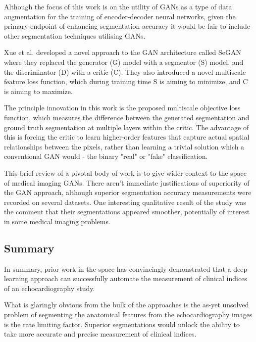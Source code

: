 Although the focus of this work is on the utility of GANs as a type of data
augmentation for the training of encoder-decoder neural networks, given the
primary endpoint of enhancing segmentation accuracy it would be fair to include
other segmentation techniques utilising GANs. \newline

Xue et al. \cite{zhangSegGANSemanticSegmentation2018} developed a novel approach
to the GAN architecture called SeGAN where they replaced the generator (G) model with a segmentor (S) model,
and the discriminator (D) with a critic (C). They also introduced a novel
multiscale feature loss function, which during training time S is aiming to
minimize, and C is aiming to maximize. \newline

The principle innovation in this work is the proposed multiscale objective loss
function, which measures the difference between the generated segmentation and ground
truth segmentation at multiple layers within the critic. The advantage of this
is forcing the critic to learn higher-order features that capture actual spatial
relationships between the pixels, rather than learning a trivial solution which
a conventional GAN would - the binary "real" or "fake" classification. \newline

This brief review of a pivotal body of work is to give wider context to the
space of medical imaging GANs. There aren't immediate justifications of
superiority of the GAN approach, although superior segmentation accuracy
measurements were recorded on several datasets. One interesting qualitative
result of the study was the comment that their segmentations appeared smoother,
potentially of interest in some medical imaging problems. \newline

\subsection{Summary}

In summary, prior work in the space has convincingly demonstrated that a deep
learning approach can successfully automate the measurement of clinical indices
of an echocardiography study. \newline

What is glaringly obvious from the bulk of the approaches is the as-yet unsolved
problem of segmenting the anatomical features from the echocardiography images
is the rate limiting factor. Superior segmentations would unlock the ability to
take more accurate and precise measurement of clinical indices. \newline